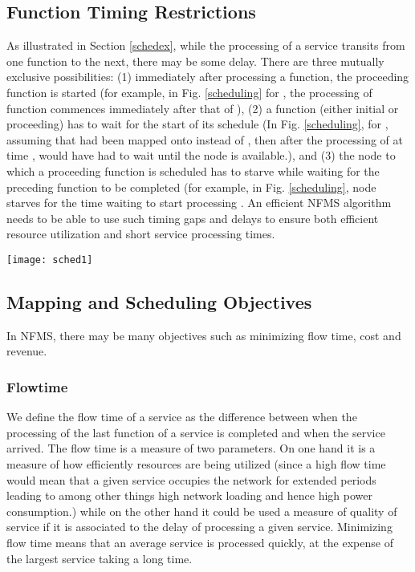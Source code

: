\documentclass[conference]{IEEEtran}
\begin{document}
\subsection{Function Timing Restrictions}\label{mutualexc}
As illustrated in Section \ref{schedex}, while the processing of a service transits from one function to the next, there may be some delay. There are three mutually exclusive possibilities: (1) immediately after processing a function, the proceeding function is started (for example, in Fig. \ref{scheduling} for , the processing of function  commences immediately after that of ), (2) a function (either initial or proceeding) has to wait for the start of its schedule (In Fig. \ref{scheduling}, for , assuming that  had been mapped onto  instead of , then after the processing of  at time ,  would have had to wait until the node is available.), and (3) the node to which a proceeding function is scheduled has to starve while waiting for the preceding function to be completed (for example, in Fig. \ref{scheduling}, node  starves for the time  waiting to start processing . An efficient NFMS algorithm needs to be able to use such timing gaps and delays to ensure both efficient resource utilization and short service processing times.
\begin{figure*}[t]
\setlength{\abovecaptionskip}{7pt plus 0pt minus 0pt}
\setlength{\belowcaptionskip}{-5pt plus 0pt minus 0pt}
\begin{minipage}{.99\textwidth}
\centering
\resizebox{.99\textwidth}{!}
{\texttt{[image: sched1]}}
  \caption{Function Scheduling}
  \label{scheduling}
  \end{minipage}
\end{figure*}

\subsection{Mapping and Scheduling Objectives}\label{objectives}
In NFMS, there may be many objectives such as minimizing flow time, cost and revenue. 
\subsubsection{Flowtime}
We define the flow time of a service as the difference between when the processing of the last function of a service is completed and when the service arrived. The flow time is a measure of two parameters. On one hand it is a measure of how efficiently resources are being utilized (since a high flow time would mean that a given service occupies the network for extended periods leading to among other things high network loading and hence high power consumption.) while on the other hand it could be used a measure of quality of service if it is associated to the delay of processing a given service. Minimizing flow time means that an average service is processed quickly, at the expense of the largest service taking a long time.
\end{document}
